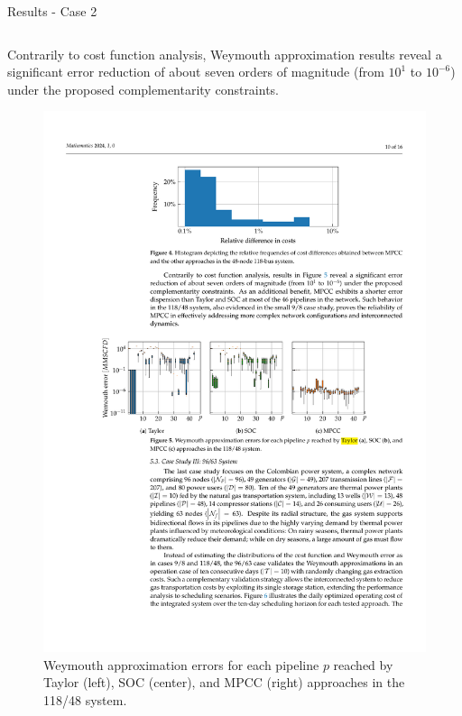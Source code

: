 \documentclass[hyperref={colorlinks,citecolor=blue,linkcolor=blue,urlcolor=blue}]{beamer}
\newlength\figureheight
\newlength\figurewidth
\begin{document}
\begin{frame}{Results - Case 2}
\begin{columns}[t,onlytextwidth]
    \begin{column}{0.52\textwidth}
        Contrarily to cost function analysis, Weymouth approximation results reveal a significant error reduction of about seven orders of magnitude (from $10^1$ to $10^{-6}$) under the proposed complementarity constraints.
        
        \vspace{1.5em}
        \begin{figure}[H]
            \centering
            \setlength{}        
            \setlength{}
            \includegraphics[width=\figurewidth, height=\figureheight]{figures/case2_error.pdf}
            \caption{\scriptsize Weymouth approximation errors for each pipeline $p$ reached by Taylor (left), SOC (center), and MPCC (right) approaches in the 118/48 system.}
            \label{fig:green_test_error}
        \end{figure}
    \end{column}
\end{columns}
\end{frame}
\end{document}

